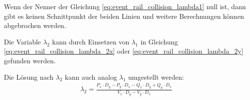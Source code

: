 Wenn der Nenner der Gleichung \ref{eq:event_rail_collision_lambda1} null ist, dann gibt es keinen Schnittpunkt der
beiden Linien und weitere Berechnungen können abgebrochen werden.

Die Variable $\lambda_2$ kann durch Einsetzen von $\lambda_1$ in Gleichung \ref{eq:event_rail_collision_lambda_2x}
oder \ref{eq:event_rail_collision_lambda_2y} gefunden werden.

Die Lösung nach $\lambda_2$ kann auch analog $\lambda_1$ umgestellt werden:
\begin{align}
    \lambda_2 = \frac{P_x \cdot D_y - P_y \cdot D_x - Q_x \cdot D_y + Q_y \cdot D_x}{V_x \cdot D_y - V_y \cdot D_x}
\end{align}


\iffalse
Komponentenweise formuliert folgt:
\begin{align}
    P_x + \lambda_1 \cdot D_x = Q_x + \lambda_2 \cdot V_x\\
    P_y + \lambda_1 \cdot D_y = Q_y + \lambda_2 \cdot V_y
\end{align}
Nach Isolation einer Unbekannten auf eine Seite:
\begin{align}
    \lambda_1 = \frac{Q_x + \lambda_2 \cdot V_x - P_x}{D_x}\\
    \lambda_1 = \frac{Q_y + \lambda_2 \cdot V_y - P_y}{D_y}
\end{align}
Nun können beide Gleichungen gleichgesetzt werden, um die Variable $\lambda_1$ zu entfernen:
\begin{align}
    \frac{Q_x + \lambda_2 \cdot V_x - P_x}{D_x} = \frac{Q_y + \lambda_2 \cdot V_y - P_y}{D_y}
\end{align}
Nun kann nach $\lambda_2$ umformuliert werden:
\begin{align}
    \frac{Q_x + \lambda_2 \cdot V_x - P_x}{D_x} = \frac{Q_y + \lambda_2 \cdot V_y - P_y}{D_y}\\
    (Q_x + \lambda_2 \cdot V_x - P_x) \cdot D_y = (Q_y + \lambda_2 \cdot V_y - P_y) \cdot D_x\\
    Q_x \cdot D_y + \lambda_2 \cdot V_x \cdot D_y - P_x \cdot D_y = Q_y \cdot D_x + \lambda_2 \cdot V_y \cdot D_x - P_y \cdot D_x\\
    \lambda_2 \cdot V_x \cdot D_y - \lambda_2 \cdot V_y \cdot D_x = P_x \cdot D_y - P_y \cdot D_x - Q_x \cdot D_y + Q_y \cdot D_x\\
    \lambda_2 (\cdot V_x \cdot D_y - V_y \cdot D_x) = P_x \cdot D_y - P_y \cdot D_x - Q_x \cdot D_y + Q_y \cdot D_x\\
    \lambda_2 = \frac{P_x \cdot D_y - P_y \cdot D_x - Q_x \cdot D_y + Q_y \cdot D_x}{V_x \cdot D_y - V_y \cdot D_x}
\end{align}
\fi